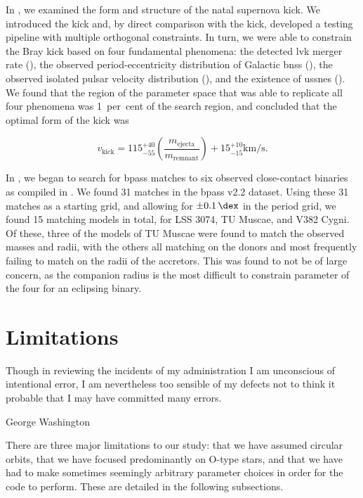 In , we examined the form and structure of the natal supernova kick. We introduced the \citet{Bray:2016} kick and, by direct comparison with the \citet{Hobbs:2005} kick, developed a testing pipeline with multiple orthogonal constraints. In turn, we were able to constrain the Bray kick based on four fundamental phenomena: the detected \gls{lvk} merger rate (), the observed period-eccentricity distribution of Galactic \glspl{bns} (), the observed isolated pulsar velocity distribution (), and the existence of \glspl{ussne} (). We found that the region of the parameter space that was able to replicate all four phenomena was 1~per~cent of the search region, and concluded that the optimal form of the kick was

\begin{equation}
    v_\text{kick} = 115^{+40}_{-55} \left(\frac{m_\text{ejecta}}{m_\text{remnant}}\right)+15^{+10}_{-15} \unit{\kilo\meter\per\second}.
\end{equation}

In , we began to search for \gls{bpass} matches to six observed close-contact binaries as compiled in \citet{Abdul-masih:2022}. We found 31 matches in the \gls{bpass} v2.2 dataset. Using these 31 matches as a starting grid, and allowing for $\pm\SI{0.1}{\dex}$ in the period grid, we found 15 matching models in total, for LSS 3074, TU Muscae, and V382 Cygni. Of these, three of the models of TU Muscae were found to match the observed masses and radii, with the others all matching on the donors and most frequently failing to match on the radii of the accretors. This was found to not be of large concern, as the companion radius is the most difficult to constrain parameter of the four for an eclipsing binary.

\section{Limitations}

\epigraph{Though in reviewing the incidents of my administration I am unconscious of intentional error, I am nevertheless too sensible of my defects not to think it probable that I may have committed many errors.}{George Washington}

There are three major limitations to our study: that we have assumed circular orbits, that we have focused predominantly on O-type stars, and that we have had to make sometimes seemingly arbitrary parameter choices in order for the code to perform. These are detailed in the following subsections.

